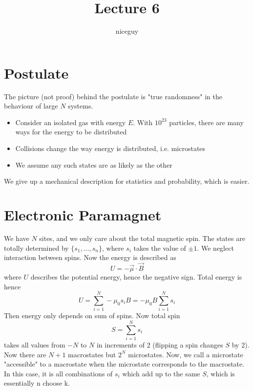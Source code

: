 \documentclass[12pt]{article}
\title{Lecture 6}
\author{niceguy}
\begin{document}
\maketitle

\section{Postulate}

The picture (not proof) behind the postulate is "true randomness" in the behaviour of large $N$ systems.

\begin{itemize}
	\item Consider an isolated gas with energy $E$. With $10^{23}$ particles, there are many ways for the energy to be distributed
	\item Collisions change the way energy is distributed, i.e. microstates
	\item We assume any such states are as likely as the other
\end{itemize}

We give up a mechanical description for statistics and probability, which is easier.

\section{Electronic Paramagnet}

We have $N$ sites, and we only care about the total magnetic spin. The states are totally determined by $\{s_1,\dots,s_n\}$, where $s_i$ takes the value of $\pm1$. We neglect interaction between spins. Now the energy is described as
$$U = -\vec{\mu}\cdot\vec{B}$$
where $U$ describes the potential energy, hence the negative sign. Total energy is hence
$$U = \sum_{i=1}^N -\mu_0s_iB = -\mu_0B\sum_{i=1}^N s_i$$
Then energy only depends on sum of spins. Now total spin
$$S = \sum_{i=1}^N s_i$$
takes all values from $-N$ to $N$ in increments of 2 (flipping a spin changes $S$ by 2). Now there are $N+1$ macrostates but $2^N$ microstates. Now, we call a microstate "accessible" to a macrostate when the microstate corresponds to the macrostate. In this case, it is all combinations of $s_i$ which add up to the same $S$, which is essentially n choose k.
\end{document}
